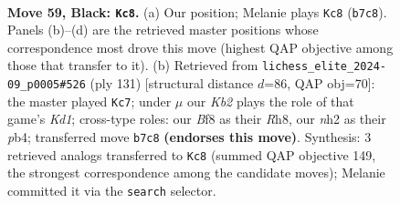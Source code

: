 \documentclass[11pt]{article}
\begin{document}
\begin{figure}[p]\centering
\begin{subfigure}{0.46\textwidth}\centering
\resizebox{\linewidth}{!}{%
\newchessgame
\chessboard[
  setfen={4rb2/1k4p1/p1p4r/Pp1b1p1p/2p2P1P/2B1P1P1/1P2K2N/1R4R1 b - - 20 59},
  showmover=false,
  pgfstyle=straightmove, color=movearrow, markmove={b7-c8}
]}
\caption{}
\end{subfigure}\hfill
\begin{subfigure}{0.46\textwidth}\centering
\resizebox{\linewidth}{!}{%
\newchessgame
\chessboard[
  setfen={2rk3r/3b1p2/4p1p1/1p1pP2p/pP3P2/P1P1K1P1/2R1B2P/3R4 b - - 72 66},
  showmover=false,
  pgfstyle=straightmove, color=movearrow, markmove={d8-c7}
]}
\caption{}
\end{subfigure}
\\[4pt]

\caption{\textbf{Move 59, Black: \texttt{Kc8}.} (a) Our position; Melanie plays \texttt{Kc8} (\texttt{b7c8}). Panels (b)--(d) are the retrieved master positions whose correspondence most drove this move (highest QAP objective among those that transfer to it). (b) Retrieved from \texttt{lichess\_elite\_2024-09\_p0005\#526} (ply 131) [structural distance $d$=86, QAP obj=70]: the master played \texttt{Kc7}; under $\mu$ our \emph{Kb2} plays the role of that game's \emph{Kd1}; cross-type roles: our \emph{B}f8 as their \emph{R}h8, our \emph{n}h2 as their \emph{p}b4; transferred move \texttt{b7c8} \textbf{(endorses this move)}. Synthesis: 3 retrieved analogs transferred to \texttt{Kc8} (summed QAP objective 149, the strongest correspondence among the candidate moves); Melanie committed it via the \texttt{search} selector.}
\label{fig:thought-m117}
\end{figure}

\clearpage
\end{document}
